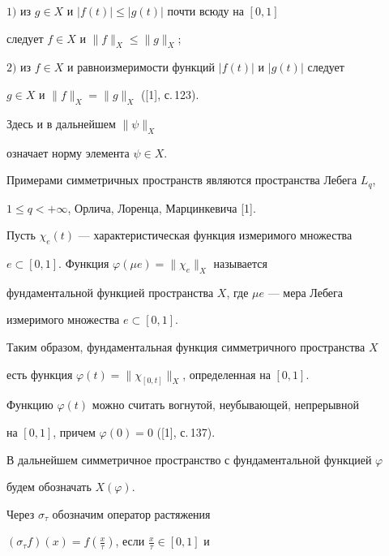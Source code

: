 $1)$ из $g\in X$ и $|f(t)|\le|g(t)|$ почти всюду на $[0,1]$ 


следует $f \in X$ и $\|f\|_X \le \|g\|_X$;





$2)$ из $f \in X$ и равноизмеримости функций $|f(t)|$ и $|g(t)|$ следует


$g \in X$ и $\|f\|_X=\|g\|_X$ ([1], с.\,123).





\noindent{}Здесь и в дальнейшем $\|\psi\|_X$ 


означает норму элемента $\psi \in X$.





Примерами симметричных пространств являются пространства Лебега $L_q$,


$1 \le q <+\infty$, Орлича, Лоренца, Марцинкевича [1].





Пусть $\chi_e(t)$ --- характеристическая функция измеримого множества 


$e \subset [0,1]$. Функция $\varphi(\mu e)=\|\chi_e\|_X$ называется 


фундаментальной функцией пространства $X$, где $\mu e$ --- мера Лебега 


измеримого множества $e \subset [0,1]$.





Таким образом, фундаментальная функция симметричного пространства $X$ 


есть функция $\varphi(t)=\|\chi_{[0,t]}\|_X$, определенная на $[0,1]$.


Функцию $\varphi(t)$ можно считать вогнутой, неубывающей, непрерывной 


на $[0,1]$, причем $\varphi(0)=0$ ([1], с.\,137).





В дальнейшем симметричное пространство с фундаментальной функцией $\varphi$ 


будем обозначать $X(\varphi)$.





Через $\sigma_{\tau}$ обозначим оператор растяжения 


$(\sigma_{\tau}f)(x)=f(\frac{x}{\tau})$, если $\frac{x}{\tau}\in [0, 1]$ и 


